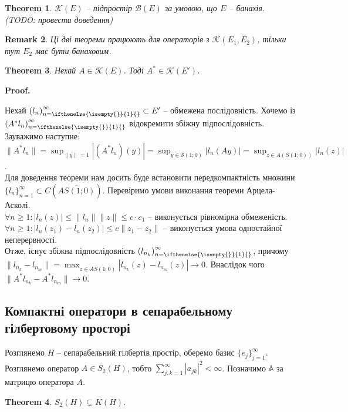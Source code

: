 \documentclass[a4paper, 10pt]{article}
\makeatletter
\theoremstyle{theoremdd}
\newtheorem{theorem}{Theorem}[subsection]
\theoremstyle{theoremdd}
\theoremstyle{theoremdd}
\theoremstyle{theoremdd}
\theoremstyle{theoremdd}
\theoremstyle{theoremdd}
\newtheorem{remark}[theorem]{Remark}
\theoremstyle{theoremdd}
\theoremstyle{theoremdd}
\newcommand{\sequence}[2][]{\left({#2}\right)_{n=\ifthenelse{\isempty{#1}}{1}{#1}}^{\infty}}
\renewenvironment{proof}[1][Proof.\\]{\par
\pushQED{\hfill \qed}%
\normalfont \topsep6\p@\@plus6\p@\relax
\trivlist
\item\relax
{\bfseries
#1\@addpunct{.}}\hspace\labelsep\ignorespaces
}{%
\popQED\endtrivlist\@endpefalse
}
\makeatother
\begin{document}
\begin{theorem}
$\mathcal{K}(E)$ -- підпростір $\mathcal{B}(E)$ за умовою, що $E$ -- банахів.\\
(TODO: провести доведення)
\end{theorem}

\begin{remark}
Ці дві теореми працюють для операторів з $\mathcal{K}(E_1,E_2)$, тільки тут $E_2$ має бути банаховим.
\end{remark}

\begin{theorem}
Нехай $A \in \mathcal{K}(E)$. Тоді $A^* \in \mathcal{K}(E')$.
\end{theorem}

\begin{proof}
Нехай $\sequence{l_n} \subset E'$ -- обмежена послідовність. Хочемо із $\sequence{A^*l_n}$ відокремити збіжну підпослідовність. Зауважимо наступне:\\
$\displaystyle \| A^*l_n \| = \sup_{ \|y\| = 1} |(A^*l_n)(y)| = \sup_{y \in \mathcal{S}(1;0)} |l_n(Ay)| = \sup_{z \in A(S(1;0))} |l_n(z)|$.\\
Для доведення теореми нам досить буде встановити передкомпактність множини $\{l_n\}_{n=1}^\infty \subset C(\overline{AS(1;0)})$. Перевіримо умови виконання теореми Арцела-Асколі.\\
$\forall n \ge 1: |l_n(z)| \leq \|l_n\| \|z\| \leq c \cdot c_1$ -- виконується рівномірна обмеженість.\\
$\forall n \geq 1: |l_n(z_1) - l_n(z_2)| \leq c\|z_1 - z_2\|$ -- виконується умова одностайної неперервності.\\
Отже, існує збіжна підпослідовність $\sequence{l_{n_k}}$, причому $\| l_{n_k} - l_{n_m} \| = \displaystyle\max_{z \in \overline{AS(1;0)}} |l_{n_k}(z) - l_{n_m}(z)| \to 0$. Внаслідок чого $\|A^* l_{n_k} - A^* l_{n_m}\| \to 0$.
\end{proof}

\subsection{Компактні оператори в сепарабельному гілбертовому просторі}
Розглянемо $H$ -- сепарабельний гілбертів простір, оберемо базис $\{e_j\}_{j=1}^\infty$. Розглянемо оператор $A \in S_2(H)$, тобто $\displaystyle\sum_{j,k=1}^\infty |a_{jk}|^2 < \infty$. Позначимо $\mathbb{A}$ за матрицю оператора $A$.

\begin{theorem}
$S_2(H) \subsetneq K(H)$.
\end{theorem}
\end{document}
